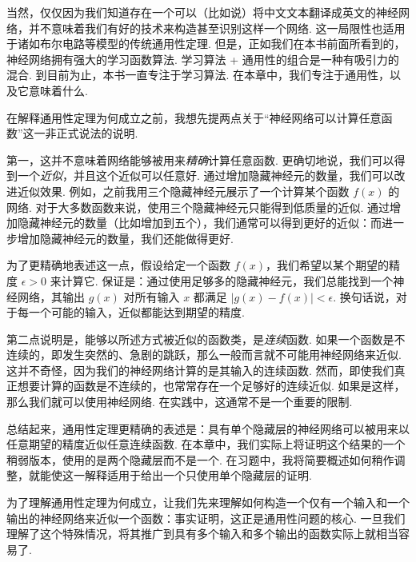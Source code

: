 当然，仅仅因为我们知道存在一个可以（比如说）将中文文本翻译成英文的神经网络，并不意味着我们有好的技术来构造甚至识别这样一个网络. 这一局限性也适用于诸如布尔电路等模型的传统通用性定理. 但是，正如我们在本书前面所看到的，神经网络拥有强大的学习函数算法. 学习算法 + 通用性的组合是一种有吸引力的混合. 到目前为止，本书一直专注于学习算法. 在本章中，我们专注于通用性，以及它意味着什么.

在解释通用性定理为何成立之前，我想先提两点关于``神经网络可以计算任意函数''这一非正式说法的说明.

第一，这并不意味着网络能够被用来\emph{精确}计算任意函数. 更确切地说，我们可以得到一个\emph{近似}，并且这个近似可以任意好. 通过增加隐藏神经元的数量，我们可以改进近似效果. 例如，之前我用三个隐藏神经元展示了一个计算某个函数 $f(x)$ 的网络. 对于大多数函数来说，使用三个隐藏神经元只能得到低质量的近似. 通过增加隐藏神经元的数量（比如增加到五个），我们通常可以得到更好的近似：而进一步增加隐藏神经元的数量，我们还能做得更好.

为了更精确地表述这一点，假设给定一个函数 $f(x)$，我们希望以某个期望的精度 $\epsilon > 0$ 来计算它. 保证是：通过使用足够多的隐藏神经元，我们总能找到一个神经网络，其输出 $g(x)$ 对所有输入 $x$ 都满足 $|g(x) - f(x)| < \epsilon$. 换句话说，对于每一个可能的输入，近似都能达到期望的精度.

第二点说明是，能够以所述方式被近似的函数类，是\emph{连续}函数. 如果一个函数是不连续的，即发生突然的、急剧的跳跃，那么一般而言就不可能用神经网络来近似. 这并不奇怪，因为我们的神经网络计算的是其输入的连续函数. 然而，即使我们真正想要计算的函数是不连续的，也常常存在一个足够好的连续近似. 如果是这样，那么我们就可以使用神经网络. 在实践中，这通常不是一个重要的限制.

总结起来，通用性定理更精确的表述是：具有单个隐藏层的神经网络可以被用来以任意期望的精度近似任意连续函数. 在本章中，我们实际上将证明这个结果的一个稍弱版本，使用的是两个隐藏层而不是一个. 在习题中，我将简要概述如何稍作调整，就能使这一解释适用于给出一个只使用单个隐藏层的证明.

为了理解通用性定理为何成立，让我们先来理解如何构造一个仅有一个输入和一个输出的神经网络来近似一个函数：事实证明，这正是通用性问题的核心. 一旦我们理解了这个特殊情况，将其推广到具有多个输入和多个输出的函数实际上就相当容易了.


